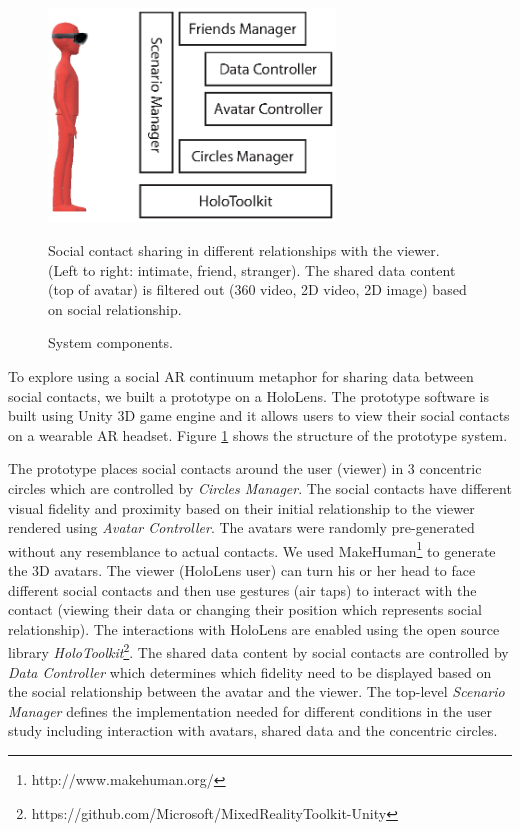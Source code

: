 \begin{figure}[ht]
	\centering
	\includegraphics[width=3in]{images/chi/images-03.eps}
	\caption{Social contact sharing in different relationships with the viewer. (Left to right: intimate, friend, stranger). The shared data content (top of avatar) is filtered out (360 video, 2D video, 2D image) based on social relationship.}
  	\caption{System components.}
  	\label{fig:data:system}
\end{figure}

To explore using a social AR continuum metaphor for sharing data between social contacts, we built a prototype on a HoloLens. The prototype software is built using Unity 3D game engine and it allows users to view their social contacts on a wearable AR headset. Figure \ref{fig:data:system} shows the structure of the prototype system. 

The prototype places social contacts around the user (viewer) in 3 concentric circles which are controlled by \textit{Circles Manager}. The social contacts have different visual fidelity and proximity based on their initial relationship to the viewer rendered using \textit{Avatar Controller}. The avatars were randomly pre-generated without any resemblance to actual contacts. We used MakeHuman\footnote{http://www.makehuman.org/} to generate the 3D avatars. The viewer (HoloLens user) can turn his or her head to face different social contacts and then use gestures (air taps) to interact with the contact (viewing their data or changing their position which represents social relationship). The interactions with HoloLens are enabled using the open source library \textit{HoloToolkit}\footnote{https://github.com/Microsoft/MixedRealityToolkit-Unity}. The shared data content by social contacts are controlled by \textit{Data Controller} which determines which fidelity need to be displayed based on the social relationship between the avatar and the viewer. The top-level \textit{Scenario Manager} defines the implementation needed for different conditions in the user study including interaction with avatars, shared data and the concentric circles. 

